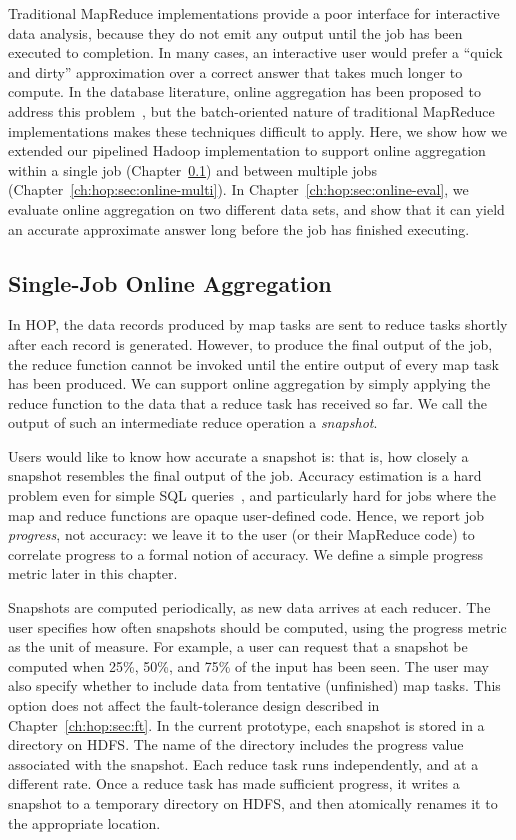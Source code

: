 Traditional MapReduce implementations provide a poor interface for interactive
data analysis, because they do not emit any output until the job has been
executed to completion.  In many cases, an interactive user would prefer a
``quick and dirty'' approximation over a correct answer that takes much longer
to compute.  In the database literature, online aggregation has been proposed
to address this problem~\cite{onlineagg}, but the batch-oriented nature of
traditional MapReduce implementations makes these techniques difficult to
apply.  Here, we show how we extended our pipelined Hadoop implementation to
support online aggregation within a single job
(Chapter~\ref{ch:hop:sec:online-single}) and between multiple jobs
(Chapter~\ref{ch:hop:sec:online-multi}).  In
Chapter~\ref{ch:hop:sec:online-eval}, we evaluate online aggregation on two
different data sets, and show that it can yield an accurate approximate answer
long before the job has finished executing.

\subsection{Single-Job Online Aggregation}
\label{ch:hop:sec:online-single}

In HOP, the data records produced by map tasks are sent to reduce tasks shortly
after each record is generated. However, to produce the final output of the job,
the reduce function cannot be invoked until the entire output of every map task
has been produced. We can support online aggregation by simply applying the
reduce function to the data that a reduce task has received so far. We call the
output of such an intermediate reduce operation a {\em snapshot}.

Users would like to know how accurate a snapshot is: that is, how closely a
snapshot resembles the final output of the job.  Accuracy estimation is a hard
problem even for simple SQL queries~\cite{dbo}, and particularly hard for jobs
where the map and reduce functions are opaque user-defined code.  Hence, we
report job {\em progress}, not accuracy: we leave it to the user (or their
MapReduce code) to correlate progress to a formal notion of accuracy.  We
define a simple progress metric later in this chapter.

Snapshots are computed periodically, as new data arrives at each reducer. The
user specifies how often snapshots should be computed, using the progress metric
as the unit of measure. For example, a user can request that a snapshot be
computed when 25\%, 50\%, and 75\% of the input has been seen. The user may also
specify whether to include data from tentative (unfinished) map tasks. This
option does not affect the fault-tolerance design described in
Chapter~\ref{ch:hop:sec:ft}. In the current prototype, each snapshot is stored in a
directory on HDFS\@. The name of the directory includes the progress value
associated with the snapshot. Each reduce task runs independently, and at a
different rate. Once a reduce task has made sufficient progress, it writes a
snapshot to a temporary directory on HDFS, and then atomically renames it to the
appropriate location.


